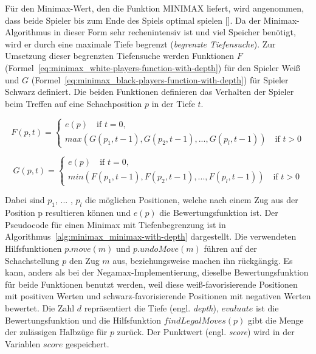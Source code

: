 Für den Minimax-Wert, den die Funktion $\text{MINIMAX}$ liefert, wird angenommen, dass beide Spieler bis zum Ende des Spiels optimal spielen [\cite{Russell2010}].
Da der Minimax-Algorithmus in dieser Form sehr rechenintensiv ist und viel Speicher benötigt, wird er durch eine maximale Tiefe begrenzt (\textit{begrenzte Tiefensuche}).
Zur Umsetzung dieser begrenzten Tiefensuche werden Funktionen $F$ (Formel~\ref{eq:minimax_white-players-function-with-depth}) für den Spieler Weiß und $G$ (Formel~\ref{eq:minimax_black-players-function-with-depth}) für Spieler Schwarz definiert.
Die beiden Funktionen definieren das Verhalten der Spieler beim Treffen auf eine Schachposition $p$ in der Tiefe $t$.

\begin{equation} \label{eq:minimax_white-players-function-with-depth}
    F(p, t) =
    \begin{cases}
        e(p) \quad \text{if } t = 0,\\
        max(G(p_1, t - 1), G(p_2, t - 1), ... , G(p_l, t - 1)) \quad \text{if } t > 0
    \end{cases}
\end{equation}

\begin{equation} \label{eq:minimax_black-players-function-with-depth}
    G(p, t) =
    \begin{cases}
        e(p) \quad \text{if } t = 0,\\
        min(F(p_1, t - 1), F(p_2, t - 1), ... , F(p_l, t - 1)) \quad \text{if } t > 0
    \end{cases}
\end{equation}

Dabei sind $p_1$, ... , $p_l$ die möglichen Positionen, welche nach einem Zug aus der Position p resultieren können und $e(p)$ die Bewertungsfunktion ist.
Der Pseudocode für einen Minimax mit Tiefenbegrenzung ist in Algorithmus~\ref{alg:minimax_minimax-with-depth} dargestellt.
Die verwendeten Hilfsfunktionen $p.move(m)$ und $p.undoMove(m)$ führen auf der Schachstellung $p$ den Zug $m$ aus, beziehungsweise machen ihn rückgängig.
Es kann, anders als bei der Negamax-Implementierung, dieselbe Bewertungsfunktion für beide Funktionen benutzt werden, weil diese weiß-favorisierende Positionen mit positiven Werten und schwarz-favorisierende Positionen mit negativen Werten bewertet.
Die Zahl $d$ repräsentiert die Tiefe (engl. \textit{depth}), $evaluate$ ist die Bewertungsfunktion und die Hilfsfunktion $findLegalMoves(p)$ gibt die Menge der zulässigen Halbzüge für $p$ zurück.
Der Punktwert (engl. \textit{score}) wird in der Variablen $score$ gespeichert.

